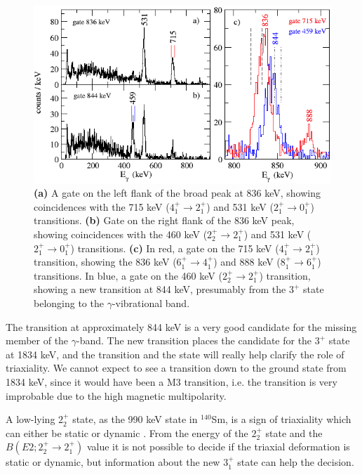 \documentclass[twoside,english]{uiofysmaster/uiofysmaster}
\newcommand{\Sm}{$^{140}$Sm} %
\newcommand{\ga}{$\gamma$}
\begin{document}
\begin{figure}[htb]
	\centering
	\includegraphics[width=\textwidth]{Images/check_state.png}
	\caption{\textbf{(a)} A gate on the left flank of the broad peak at 836 keV, showing coincidences with the 715 keV ($4_1^+ \rightarrow 2_1^+$) and 531 keV ($2_1^+ \rightarrow 0_1^+$) transitions.
	\textbf{(b)} Gate on the right flank of the 836 keV peak, showing coincidences with the 460 keV ($2_2^+ \rightarrow 2_1^+$) and 531 keV ($2_1^+ \rightarrow 0_1^+$) transitions.
	\textbf{(c)} In red, a gate on the 715 keV ($4_1^+ \rightarrow 2_1^+$) transition, showing the 836 keV ($6_1^+ \rightarrow 4_1^+$) and 888 keV ($8_1^+ \rightarrow 6_1^+$) transitions. In blue, a gate on the 460 keV ($2_2^+ \rightarrow 2_1^+$) transition, showing a new transition at 844 keV, presumably from the $3^+$ state belonging to the \ga-vibrational band.}
	\label{fig:check_state}
\end{figure}


The transition at approximately 844 keV is a very good candidate for the missing member of the \ga-band. 
The new transition places the candidate for the $3^+$ state at 1834 keV, and the transition and the state will really help clarify the role of triaxiality. 
We cannot expect to see a transition down to the ground state from 1834 keV, since it would have been a M3 transition, i.e. the transition is very improbable due to the high magnetic multipolarity. 

A low-lying $2_2^+$ state, as the 990 keV state in \Sm, is a sign of triaxiality which can either be static or dynamic \cite{Klintefjord2016}.
From the energy of the $2_2^+$ state and the $B(E2; 2_2^+ \rightarrow 2_1^+)$ value it is not possible to decide if the triaxial deformation is static or dynamic, but information about the new $3_1^+$ state can help the decision.
\end{document}
